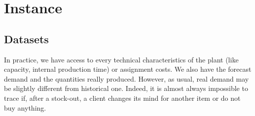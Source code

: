 



\section{Instance}


\subsection{Datasets}


In practice, we have access to every technical characteristics of the plant (like capacity, internal production time) or assignment costs.
We also have the forecast demand and the quantities really produced.
However, as usual, real demand may be slightly different from historical one.
Indeed, it is almost always impossible to trace if, after a stock-out, a client changes its mind for another item or do not buy anything.


